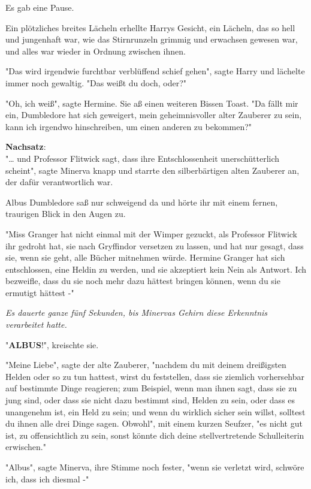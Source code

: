 {Es gab eine Pause.

Ein plötzliches breites Lächeln erhellte Harrys Gesicht, ein Lächeln, das so hell und jungenhaft war, wie das Stirnrunzeln grimmig und erwachsen gewesen war, und alles war wieder in Ordnung zwischen ihnen.

"Das wird irgendwie furchtbar verblüffend schief gehen", sagte Harry und lächelte immer noch gewaltig. "Das weißt du doch, oder?"

"Oh, ich weiß", sagte Hermine. Sie aß einen weiteren Bissen Toast. "Da fällt mir ein, Dumbledore hat sich geweigert, mein geheimnisvoller alter Zauberer zu sein, kann ich irgendwo hinschreiben, um einen anderen zu bekommen?"

\textbf{Nachsatz}:\\ "… und Professor Flitwick sagt, dass ihre Entschlossenheit unerschütterlich scheint", sagte Minerva knapp und starrte den silberbärtigen alten Zauberer an, der dafür verantwortlich war.

Albus Dumbledore saß nur schweigend da und hörte ihr mit einem fernen, traurigen Blick in den Augen zu.

"Miss Granger hat nicht einmal mit der Wimper gezuckt, als Professor Flitwick ihr gedroht hat, sie nach Gryffindor versetzen zu lassen, und hat nur gesagt, dass sie, wenn sie geht, alle Bücher mitnehmen würde. Hermine Granger hat sich entschlossen, eine Heldin zu werden, und sie akzeptiert kein Nein als Antwort. Ich bezweifle, dass du sie noch mehr dazu hättest bringen können, wenn du sie ermutigt hättest -"

\emph{Es dauerte ganze fünf Sekunden, bis Minervas Gehirn diese Erkenntnis verarbeitet hatte.}

"\textbf{ALBUS}!", kreischte sie.

"Meine Liebe", sagte der alte Zauberer, "nachdem du mit deinem dreißigsten Helden oder so zu tun hattest, wirst du feststellen, dass sie ziemlich vorhersehbar auf bestimmte Dinge reagieren; zum Beispiel, wenn man ihnen sagt, dass sie zu jung sind, oder dass sie nicht dazu bestimmt sind, Helden zu sein, oder dass es unangenehm ist, ein Held zu sein; und wenn du wirklich sicher sein willst, solltest du ihnen alle drei Dinge sagen. Obwohl", mit einem kurzen Seufzer, "es nicht gut ist, zu offensichtlich zu sein, sonst könnte dich deine stellvertretende Schulleiterin erwischen."

"Albus", sagte Minerva, ihre Stimme noch fester, "wenn sie verletzt wird, schwöre ich, dass ich diesmal -"

}
